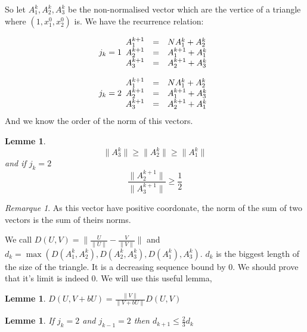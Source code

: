 \documentclass[12pt]{article}
\theoremstyle{plain}%
\newtheorem{lem}[thm]{Lemme}
\theoremstyle{definition}
\theoremstyle{remark}
\newtheorem*{rmq}{Remarque}
\begin{document}
So let $A_1^k,A_2^k,A_3^k$ be the non-normalised vector which are the vertice of a triangle where $(1,x_1^0,x_2^0)$ is. We have the recurrence relation:

\[j_k=1
\begin{array}{c c l}
A_1^{k+1} & = & N A_1^k+A_2^k\\
A_2^{k+1} & = & A_1^{k+1} + A_1^k \\
A_3^{k+1} & = & A_2^{k+1} + A_3^k
\end{array}
\]

\[j_k=2
\begin{array}{c c l}
A_1^{k+1} & = & N A_1^k+A_2^k\\
A_2^{k+1} & = & A_1^{k+1} + A_3^k \\
A_3^{k+1} & = & A_2^{k+1} + A_1^k
\end{array}
\]
And we know the order of the norm of this vectors.
\begin{lem}
\[
\|A_3^k \| \geq \|A_2^k\| \geq \|A_1^k \|
\]
and if $j_k=2$
\[
\frac{\|A_2^{k+1}\|}{\|A_3^{k+1}\|} \geq \frac{1}{2}
\]
\end{lem}
\begin{rmq}
As this vector have positive coordonate, the norm of the sum of two vectors is the sum of theirs norms.
\end{rmq}
We call $D(U,V)=\|\frac{U}{\|U \|}- \frac{V}{\|V\|}\|$ and $d_k=\max(D(A_1^k,A_2^k),D(A_2^k,A_3^k),D(A_1^k),A_3^k)$. $d_k$ is the biggest length of the size of the triangle. It is a decreasing sequence bound by $0$. We should prove that it's limit is indeed $0$.\newline
We will use this useful lemma,
\begin{lem}
 $D(U,V+b U)=\frac{\|V\|}{\|V+b U\|}D(U,V)$
\end{lem}
\begin{lem}
If $j_k=2$ and $j_{k-1}=2$ then $d_{k+1} \leq \frac{2}{3} d_k$
\end{lem}
\end{document}
